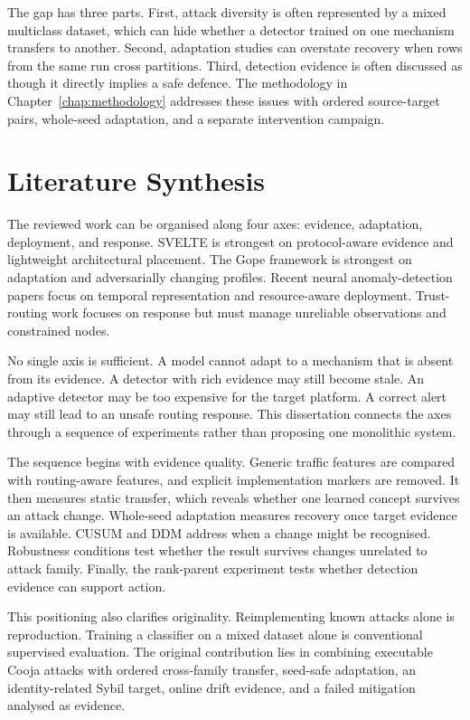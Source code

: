 The gap has three parts. First, attack diversity is often represented by a mixed multiclass dataset, which can hide whether a detector trained on one mechanism transfers to another. Second, adaptation studies can overstate recovery when rows from the same run cross partitions. Third, detection evidence is often discussed as though it directly implies a safe defence. The methodology in Chapter~\ref{chap:methodology} addresses these issues with ordered source-target pairs, whole-seed adaptation, and a separate intervention campaign.

\section{Literature Synthesis}

The reviewed work can be organised along four axes: evidence, adaptation, deployment, and response. SVELTE is strongest on protocol-aware evidence and lightweight architectural placement. The Gope framework is strongest on adaptation and adversarially changing profiles. Recent neural anomaly-detection papers focus on temporal representation and resource-aware deployment. Trust-routing work focuses on response but must manage unreliable observations and constrained nodes.

No single axis is sufficient. A model cannot adapt to a mechanism that is absent from its evidence. A detector with rich evidence may still become stale. An adaptive detector may be too expensive for the target platform. A correct alert may still lead to an unsafe routing response. This dissertation connects the axes through a sequence of experiments rather than proposing one monolithic system.

The sequence begins with evidence quality. Generic traffic features are compared with routing-aware features, and explicit implementation markers are removed. It then measures static transfer, which reveals whether one learned concept survives an attack change. Whole-seed adaptation measures recovery once target evidence is available. CUSUM and DDM address when a change might be recognised. Robustness conditions test whether the result survives changes unrelated to attack family. Finally, the rank-parent experiment tests whether detection evidence can support action.

This positioning also clarifies originality. Reimplementing known attacks alone is reproduction. Training a classifier on a mixed dataset alone is conventional supervised evaluation. The original contribution lies in combining executable Cooja attacks with ordered cross-family transfer, seed-safe adaptation, an identity-related Sybil target, online drift evidence, and a failed mitigation analysed as evidence.

